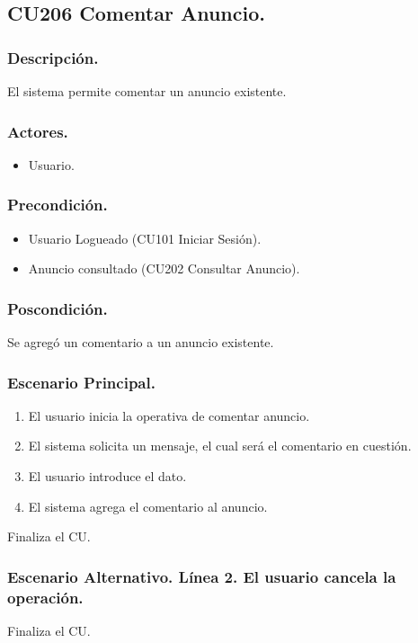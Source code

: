 \subsection{CU206 Comentar Anuncio.}
\subsubsection{Descripci\'{o}n.}
El sistema permite comentar un anuncio existente.
\subsubsection{Actores.}
\begin{itemize}
\item Usuario.
\end{itemize}
\subsubsection{Precondici\'{o}n.}
\begin{itemize}
\item Usuario Logueado (CU101 Iniciar Sesi\'{o}n).
\item Anuncio consultado (CU202 Consultar Anuncio).
\end{itemize}
\subsubsection{Poscondici\'{o}n.}
Se agreg\'{o} un comentario a un anuncio existente.
\subsubsection{Escenario Principal.}
\begin{enumerate}
\item El usuario inicia la operativa de comentar anuncio.
\item El sistema solicita un mensaje, el cual ser\'{a} el comentario en cuesti\'{o}n.
\item El usuario introduce el dato.
\item El sistema agrega el comentario al anuncio.
\end{enumerate}
Finaliza el CU.
\subsubsection{Escenario Alternativo. L\'{i}nea 2. El usuario cancela la operaci\'{o}n.}
Finaliza el CU.
